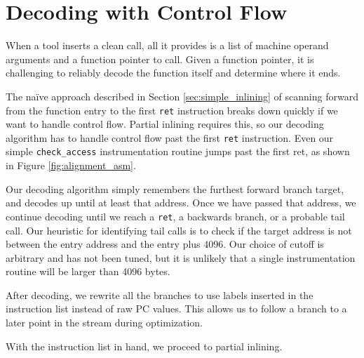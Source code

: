 \section{Decoding with Control Flow}
\label{sec:decoding_cti}

When a tool inserts a clean call, all it provides is a list of machine operand
arguments and a function pointer to call.  Given a function pointer, it is
challenging to reliably decode the function itself and determine where it ends.

The na\"ive approach described in Section \ref{sec:simple_inlining} of scanning
forward from the function entry to the first {\tt ret} instruction breaks down
quickly if we want to handle control flow.  Partial inlining requires this, so
our decoding algorithm has to handle control flow past the first {\tt ret}
instruction.  Even our simple {\tt check\_access} instrumentation routine jumps
past the first ret, as shown in Figure \ref{fig:alignment_asm}.

Our decoding algorithm simply remembers the furthest forward branch target, and
decodes up until at least that address.  Once we have passed that address, we
continue decoding until we reach a {\tt ret}, a backwards branch, or a probable
tail call.  Our heuristic for identifying tail calls is to check if the target
address is not between the entry address and the entry plus 4096.  Our choice of
cutoff is arbitrary and has not been tuned, but it is unlikely that a single
instrumentation routine will be larger than 4096 bytes.

After decoding, we rewrite all the branches to use labels inserted in the
instruction list instead of raw PC values.  This allows us to follow a branch to
a later point in the stream during optimization.

With the instruction list in hand, we proceed to partial inlining.

